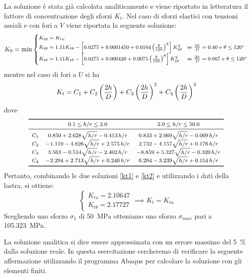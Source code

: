 La soluzione è stata già calcolata analiticamente e viene riportato in letteratura il fattore di concentrazione degli sforzi $K_t$.
Nel caso di sforzi elastici con tensioni assiali e con fori a $V$ viene riportata la seguente soluzione:
\begin{equation}\footnotesize\label{kt1}
K_0=\min
\begin{cases}
K_{t\theta}=K_{tu} & \\
K_{t\theta} = 1.11 K_{t\theta} - \left[0.0275 + 0.0001450 + 0.0164\left(\frac{\theta}{120}\right)^8\right]K_{t\theta}^2 & \text{se $\frac{2h}{D} = 0.40$ e $\theta\le \ang{120}$}\\
K_{t\theta} = 1.11 K_{t\theta} - \left[0.0275 + 0.000420 + 0.0075\left(\frac{\theta}{120}\right)^8\right]K_{t\theta}^2 & \text{se $\frac{2h}{D} = 0.667$ e $\theta\le \ang{120}$}
\end{cases}
\end{equation} 
mentre nel caso di fori a $U$ si ha
\begin{equation}\footnotesize\label{kt2}
K_t = C_1 + C_2\left(\frac{2h}{D}\right) + C_3\left(\frac{2h}{D}\right)^2 + C_4\left(\frac{2h}{D}\right)^3
\end{equation} 
dove 
\[ \footnotesize
\begin{array}{ccc}
\toprule
 & 0.1\le h/r\le 2.0 & 2.0\le h/r\le 50.0 \\ \midrule
C_1 & 0.850+2.628\sqrt{h/r}-0.413\,h/r & 0.833+2.069\sqrt{h/r}-0.009\,h/r \\ 
C_2 & -1.119-4.826\sqrt{h/r}+2.575\,h/r & 2.732-4.157\sqrt{h/r}+0.176\,h/r \\  
C_3 & 3.563-0.514\sqrt{h/r}-2.402\,h/r & -8.859+5.327\sqrt{h/r}-0.320\,h/r \\  
C_4 & -2.294 + 2.713\sqrt{h/r}+0.240\,h/r & 6.294-3.239\sqrt{h/r}+0.154\,h/r \\  \bottomrule
\end{array}
\]
Pertanto, combinando le due soluzioni \eqref{kt1} e \eqref{kt2} e utilizzando i dati della lastra, si ottiene:
\[
\begin{cases}
K_{tu}=2.10647\\
K_{t\theta}=2.17727
\end{cases} \implies K_t = K_{tu}
\]
Scegliendo uno sforzo $\sigma_1$ di \SI{50}{\mega\pascal} otteniamo uno sforzo $\sigma_{max}$ pari a \SI{105.323}{\mega\pascal}.

La soluzione analitica si dice essere approssimata con un errore massimo del \SI{5}{\%} dalla soluzione reale. 
In questa esercitazione cercheremo di verificare la seguente affermazione utilizzando il programma Abaqus per calcolare la soluzione con gli elementi finiti.
